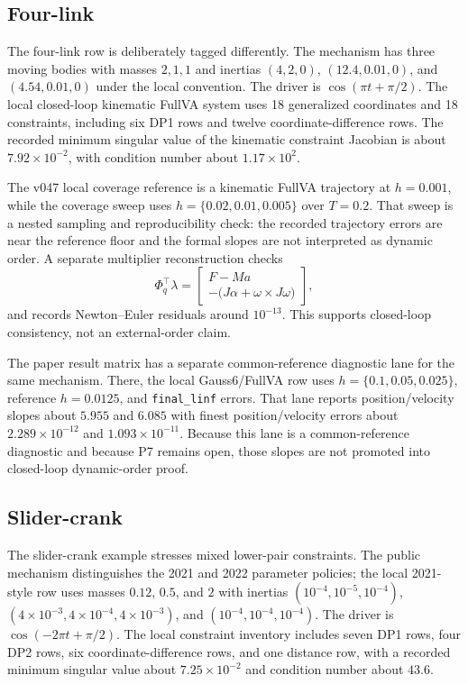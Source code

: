 \documentclass[10pt]{article}
\newcommand{\method}{Gauss6/FullVA}
\begin{document}
\subsection{Four-link}

The four-link row is deliberately tagged differently. The mechanism has three
moving bodies with masses $2,1,1$ and inertias
$(4,2,0)$, $(12.4,0.01,0)$, and $(4.54,0.01,0)$ under the local convention.
The driver is $\cos(\pi t+\pi/2)$. The local closed-loop kinematic FullVA
system uses 18 generalized coordinates and 18 constraints, including six DP1
rows and twelve coordinate-difference rows. The recorded minimum singular
value of the kinematic constraint Jacobian is about $7.92\times10^{-2}$, with
condition number about $1.17\times10^2$.

The v047 local coverage reference is a kinematic FullVA trajectory at
$h=0.001$, while the coverage sweep uses $h=\{0.02,0.01,0.005\}$ over $T=0.2$.
That sweep is a nested sampling and reproducibility check: the recorded
trajectory errors are near the reference floor and the formal slopes are not
interpreted as dynamic order. A separate multiplier reconstruction checks
\[
  \Phi_q^\top \lambda =
  \begin{bmatrix}
  F-Ma\\
  -\bigl(J\alpha+\omega\times J\omega\bigr)
  \end{bmatrix},
\]
and records Newton--Euler residuals around $10^{-13}$. This supports
closed-loop consistency, not an external-order claim.

The paper result matrix has a separate common-reference diagnostic lane for
the same mechanism. There, the local \method{} row uses
$h=\{0.1,0.05,0.025\}$, reference $h=0.0125$, and \texttt{final\_linf}
errors. That lane reports position/velocity slopes about $5.955$ and $6.085$
with finest position/velocity errors about $2.289\times 10^{-12}$ and
$1.093\times 10^{-11}$. Because this lane is a common-reference diagnostic and
because P7 remains open, those slopes are not promoted into closed-loop
dynamic-order proof.

\subsection{Slider-crank}

The slider-crank example stresses mixed lower-pair constraints. The public
mechanism distinguishes the 2021 and 2022 parameter policies; the local
2021-style row uses masses $0.12$, $0.5$, and $2$ with inertias
$(10^{-4},10^{-5},10^{-4})$, $(4\times10^{-3},4\times10^{-4},4\times10^{-3})$,
and $(10^{-4},10^{-4},10^{-4})$. The driver is
$\cos(-2\pi t+\pi/2)$. The local constraint inventory includes seven DP1
rows, four DP2 rows, six coordinate-difference rows, and one distance row,
with a recorded minimum singular value about $7.25\times10^{-2}$ and
condition number about $43.6$.
\end{document}
